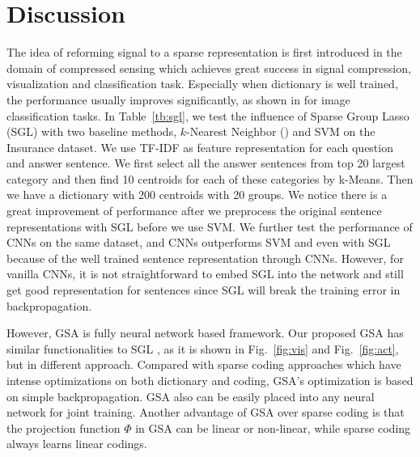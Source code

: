 \section{Discussion}
\label{sec:related}

\begin{table}%
\centering
{}
\caption{Experiments for two baseline model, \kNN and SVM, for the Insurance dataset.}
\label{tb:sgl}
\vspace{-1mm}
\end{table}

The idea of reforming signal to a sparse representation is first introduced in the domain of compressed sensing \cite{Candes+:2008} which achieves great success in signal compression, visualization and classification task. Especially when dictionary is well trained, the performance usually improves significantly, as shown in \cite{Wang:2010,Yang:2009} for image classification tasks. 
In Table~\ref{tb:sgl}, we test the influence of Sparse Group Lasso (SGL) \cite{Simon13asparse-group} with two baseline methods, $k$-Nearest Neighbor (\kNN) and SVM on the Insurance dataset. We use TF-IDF as feature representation for each question and answer sentence. We first select all the answer sentences from top 20 largest category and then find 10 centroids for each of these categories by k-Means. Then we have a dictionary with 200 centroids with 20 groups. We notice there is a great improvement of performance after we preprocess the original sentence representations with SGL before we use SVM. We further test the performance of CNNs on the same dataset, and CNNs outperforms SVM and \kNN even with SGL because of the well trained sentence representation through CNNs. However, for vanilla CNNs, it is not straightforward to embed SGL into the network and still get good representation for sentences since SGL will break the training error in backpropagation. 


However, GSA is fully neural network based framework. Our proposed GSA has similar functionalities to SGL \cite{Yuan06modelselection,Simon13asparse-group}, as it is shown in Fig.~\ref{fig:vis} and Fig.~\ref{fig:act}, but in different approach. Compared with sparse coding approaches which have intense optimizations on both dictionary and coding, GSA's optimization is based on simple backpropagation. GSA also can be easily placed into any neural network for joint training. 
Another advantage of GSA over sparse coding is that the projection function $\Phi$ in GSA can be linear or non-linear, while sparse coding always learns linear codings. 
